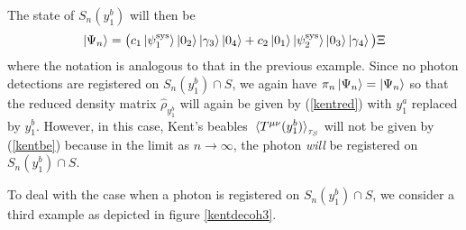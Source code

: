 The state of $S_n(y^b_1)$ will then be
 \begin{equation*}
 \ket{\Psi_n}=\big(c_1\ket{\psi_1^\text{sys}}\ket{0_2}\ket{\gamma_3}\ket{0_4}+c_2\ket{0_1}\ket{\psi_2^\text{sys}}\ket{0_3}\ket{\gamma_4}\big)\Xi
 \end{equation*}
 where the notation is analogous to that in the previous example. Since no photon detections are registered on $S_n(y^b_1)\cap S$, we again have $\pi_n\ket{\Psi_n}=\ket{\Psi_n}$ so that the reduced density matrix $\hat{\rho}_{y_1^b}$ will again be given by  (\ref{kentred}) with $y^a_1$ replaced by $y^b_1$. However, in this case, Kent's beables $\ev*{T^{\mu\nu}(y^b_1)}_{\tau_S}$ will not be given by (\ref{kentbe}) because in the limit as $n\rightarrow\infty$, the photon \emph{will} be registered on $S_n(y^b_1)\cap S$. 
 
 To deal with the case when a photon is registered on $S_n(y^b_1)\cap S$, we consider a third example as depicted in figure \ref{kentdecoh3}.


